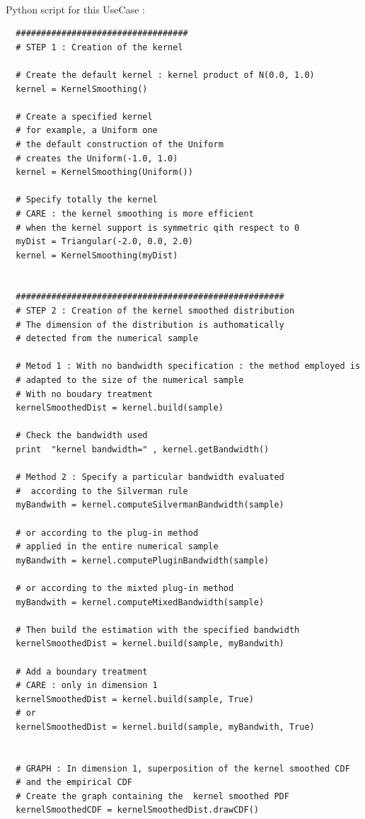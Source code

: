 \textspace\\
Python script for this UseCase :

\begin{lstlisting}
  ##################################
  # STEP 1 : Creation of the kernel

  # Create the default kernel : kernel product of N(0.0, 1.0)
  kernel = KernelSmoothing()

  # Create a specified kernel
  # for example, a Uniform one
  # the default construction of the Uniform
  # creates the Uniform(-1.0, 1.0)
  kernel = KernelSmoothing(Uniform())

  # Specify totally the kernel
  # CARE : the kernel smoothing is more efficient
  # when the kernel support is symmetric qith respect to 0
  myDist = Triangular(-2.0, 0.0, 2.0)
  kernel = KernelSmoothing(myDist)


  #####################################################
  # STEP 2 : Creation of the kernel smoothed distribution
  # The dimension of the distribution is authomatically
  # detected from the numerical sample

  # Metod 1 : With no bandwidth specification : the method employed is
  # adapted to the size of the numerical sample
  # With no boudary treatment
  kernelSmoothedDist = kernel.build(sample)

  # Check the bandwidth used
  print  "kernel bandwidth=" , kernel.getBandwidth()

  # Method 2 : Specify a particular bandwidth evaluated
  #  according to the Silverman rule
  myBandwith = kernel.computeSilvermanBandwidth(sample)

  # or according to the plug-in method
  # applied in the entire numerical sample
  myBandwith = kernel.computePluginBandwidth(sample)

  # or according to the mixted plug-in method
  myBandwith = kernel.computeMixedBandwidth(sample)

  # Then build the estimation with the specified bandwidth
  kernelSmoothedDist = kernel.build(sample, myBandwith)

  # Add a boundary treatment
  # CARE : only in dimension 1
  kernelSmoothedDist = kernel.build(sample, True)
  # or
  kernelSmoothedDist = kernel.build(sample, myBandwith, True)


  # GRAPH : In dimension 1, superposition of the kernel smoothed CDF
  # and the empirical CDF
  # Create the graph containing the  kernel smoothed PDF
  kernelSmoothedCDF = kernelSmoothedDist.drawCDF()


\end{lstlisting}
